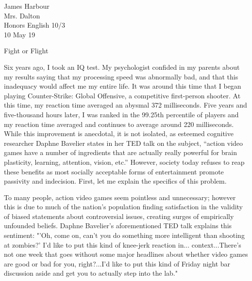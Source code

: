 \documentclass[12pt]{article}
\begin{document}
\begin{flushleft}

James Harbour \\
Mrs. Dalton \\
Honors English 10/3 \\
10 May 19 \\

\begin{center}
Fight or Flight
\end{center}

\setlength{\parindent}{0.5in}

\normalsize

Six years ago, I took an IQ test. My psychologist confided in my parents about my results saying that my processing speed was abnormally bad, and that this inadequacy would affect me my entire life. It was around this time that I began playing Counter-Strike: Global Offensive, a competitive first-person shooter. At this time, my reaction time averaged an abysmal 372 milliseconds. Five years and five-thousand hours later, I was ranked in the 99.25th percentile of players and my reaction time averaged and continues to average around 220 milliseconds. While this improvement is anecdotal, it is not isolated, as esteemed cognitive researcher Daphne Bavelier states in her TED talk on the subject, “action video games have a number of ingredients that are actually really powerful for brain plasticity, learning, attention, vision, etc.” However, society today refuses to reap these benefits as most socially acceptable forms of entertainment promote passivity and indecision. First, let me explain the specifics of this problem.

To many people, action video games seem pointless and unnecessary; however this is due to much of the nation's population finding satisfaction in the validity of biased statements about controversial issues, creating surges of empirically unfounded beliefs. Daphne Bavelier's aforementioned TED talk explains this sentiment: "'Oh, come on, can't you do something more intelligent than shooting at zombies?' I'd like to put this kind of knee-jerk reaction in... context...There's not one week that goes without some major headlines about whether video games are good or bad for you, right?...I'd like to put this kind of Friday night bar discussion aside and get you to actually step into the lab."


\end{flushleft}
\end{document}

